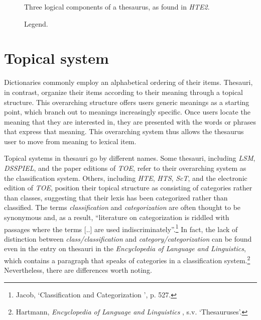 \begin{figure}[htbp]
	\framebox[\textwidth]{
		\scalebox{0.65}[0.65]{
		    
%            
		}
	}
	\caption[]{\label{fig:Stolk_thes-content:Content-parts} Three logical components of a thesaurus, as found in \textit{HTE2}.}
\end{figure} 

\begin{figure}[htbp]
	\framebox[\textwidth]{
		\scalebox{0.65}[0.65]{
		    
		}
	}
	\caption[]{\label{fig:Stolk_thes-content:legend} Legend.}
\end{figure} 

\section{Topical system}
\label{sect:Stolk_thes-content:TopicalSystem}
Dictionaries commonly employ an alphabetical ordering of their items. Thesauri, in contrast, organize their items according to their meaning through a topical structure. This overarching structure offers users generic meanings as a starting point, which branch out to meanings increasingly specific. Once users locate the meaning that they are interested in, they are presented with the words or phrases that express that meaning. This overarching system thus allows the thesaurus user to move from meaning to lexical item.

Topical systems in thesauri go by different names. Some thesauri, including \textit{LSM}, \textit{DSSPIEL}, and the paper editions of \textit{TOE}, refer to their overarching system as the classification system. Others, including \textit{HTE}, \textit{HTS}, \textit{ScT}, and the electronic edition of \textit{TOE}, position their topical structure as consisting of categories rather than classes, suggesting that their lexis has been categorized rather than classified. The terms \textit{classification} and \textit{categorization} are often thought to be synonymous and, as a result, ``literature on categorization is riddled with passages where the terms [..] are used indiscriminately''.\footnote{Jacob, `Classification and Categorization%
', %
p. 527.} In fact, the lack of distinction between \textit{class/classification} and \textit{category/categorization} can be found even in the entry on thesauri in the \textit{Encyclopedia of Language and Linguistics}, which contains a paragraph that speaks of categories in a classification system.\footnote{Hartmann, \textit{Encyclopedia of Language and Linguistics}%
, s.v. `Thesauruses'.} Nevertheless, there are differences worth noting.

